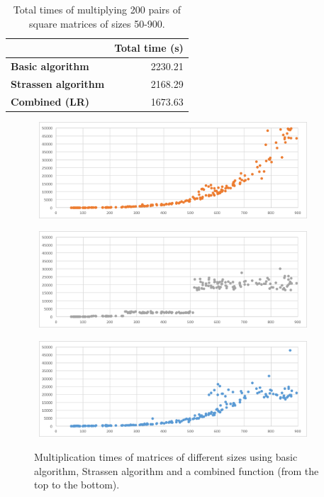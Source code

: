 \begin{table}[]
	\captionsetup{justification=centering,margin=0.5cm}
\bgroup
\def\arraystretch{1.5}%
\begin{center}
	\begin{tabular}{|l|r|}
		\hline
		& \multicolumn{1}{l|}{\textbf{Total time (s)}} \\ \hline
		\textbf{Basic algorithm}    & 2230.21                                      \\ \hline
		\textbf{Strassen algorithm} & 2168.29                                       \\ \hline
		\textbf{Combined (LR)}      & 1673.63                                       \\ \hline
	\end{tabular}
\end{center}
\egroup
\caption{Total times of multiplying 200 pairs of square matrices of sizes 50-900.}
\label{tab:matrix_results}
\end{table}


\begin{figure}[h!]
	\captionsetup{justification=centering,margin=0.5cm}
	\centerline{
		\mbox{
			\includegraphics[width=100mm]{./img/matrix_mul_basic.png}
		}
	}
	\centerline{
	\mbox{
		\includegraphics[width=100mm]{./img/matrix_mul_strassen.png}
	}
}
	\centerline{
	\mbox{
		\includegraphics[width=100mm]{./img/matrix_mul_combined.png}
	}
}
	\caption{Multiplication times of matrices of different sizes using basic algorithm, Strassen algorithm and a combined function (from the top to the bottom).}
	\label{fig:matrix_mul_graph}
\end{figure}

